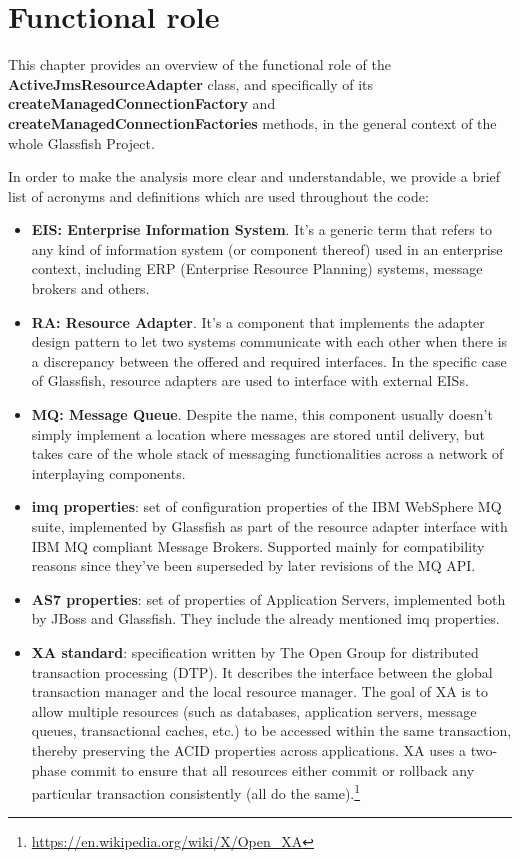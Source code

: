 \chapter{Functional role}
This chapter provides an overview of the functional role of the \textbf{ActiveJmsResourceAdapter} class, and specifically of its \textbf{createManagedConnectionFactory} and \textbf{createManagedConnectionFactories} methods, in the general context of the whole Glassfish Project.

In order to make the analysis more clear and understandable, we provide a brief list of acronyms and definitions which are used throughout the code:
\begin{itemize}
	\item \textbf{EIS: Enterprise Information System}. It's a generic term that refers to any kind of information system (or component thereof) used in an enterprise context, including ERP (Enterprise Resource Planning) systems, message brokers and others.
	\item \textbf{RA: Resource Adapter}. It's a component that implements the adapter design pattern to let two systems communicate with each other when there is a discrepancy between the offered and required interfaces. In the specific case of Glassfish, resource adapters are used to interface with external EISs.
	\item \textbf{MQ: Message Queue}. Despite the name, this component usually doesn't simply implement a location where messages are stored until delivery, but takes care of the whole stack of messaging functionalities across a network of interplaying components. 
	\item \textbf{imq properties}: set of configuration properties of the IBM WebSphere MQ suite, implemented by Glassfish as part of the resource adapter interface with IBM MQ compliant Message Brokers. Supported mainly for compatibility reasons since they've been superseded by later revisions of the MQ API. 
	\item \textbf{AS7 properties}: set of properties of Application Servers, implemented both by JBoss and Glassfish. They include the already mentioned imq properties. 
	\item \textbf{XA standard}: specification written by The Open Group for distributed transaction processing (DTP). It describes the interface between the global transaction manager and the local resource manager. The goal of XA is to allow multiple resources (such as databases, application servers, message queues, transactional caches, etc.) to be accessed within the same transaction, thereby preserving the ACID properties across applications. XA uses a two-phase commit to ensure that all resources either commit or rollback any particular transaction consistently (all do the same).\footnote{\url{https://en.wikipedia.org/wiki/X/Open_XA}}

\end{itemize}
